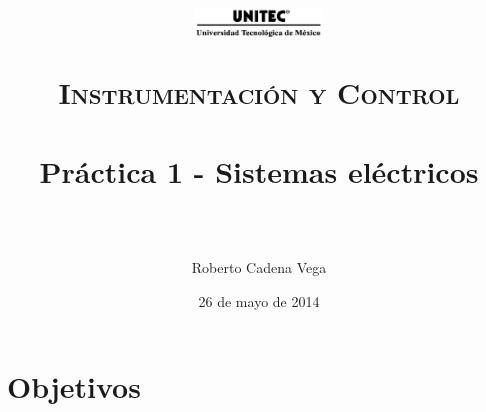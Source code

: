 



\title{	
	\normalfont \normalsize
	\begin{figure}[h]
		\begin{center}
			\includegraphics[width=0.3\textwidth]{../images/UNITEC.png}
		\end{center}
	\end{figure}
	\textsc{Instrumentación y Control} \\ [25pt]
	\horrule{0.5pt} \\[0.4cm] %
	\huge Práctica 1 - Sistemas eléctricos \\ %
	\horrule{2pt} \\[0.5cm] %
}

\author{Roberto Cadena Vega} %

\date{\normalsize 26 de mayo de 2014} %




\maketitle %


\section{Objetivos}

